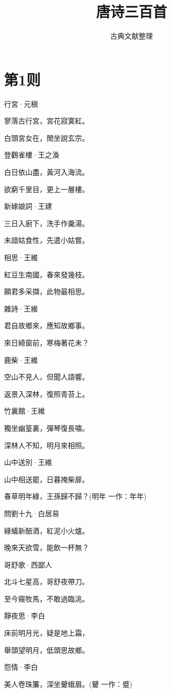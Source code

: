 \documentclass[12pt,a4paper]{ctexbook}
\title{唐诗三百首}
\author{古典文献整理}
\date{}
\begin{document}
\maketitle
\tableofcontents
\newpage
\section{第1则}
行宮·元稹\par
寥落古行宮，宮花寂寞紅。\par
白頭宮女在，閒坐說玄宗。\par
登鸛雀樓·王之渙\par
白日依山盡，黃河入海流。\par
欲窮千里目，更上一層樓。\par
新嫁娘詞·王建\par
三日入廚下，洗手作羹湯。\par
未諳姑食性，先遣小姑嘗。\par
相思·王維\par
紅豆生南國，春來發幾枝。\par
願君多采擷，此物最相思。\par
雜詩·王維\par
君自故鄉來，應知故鄉事。\par
來日綺窗前，寒梅著花未？\par
鹿柴·王維\par
空山不見人，但聞人語響。\par
返景入深林，復照青苔上。\par
竹裏館·王維\par
獨坐幽篁裏，彈琴復長嘯。\par
深林人不知，明月來相照。\par
山中送別·王維\par
山中相送罷，日暮掩柴扉。\par
春草明年綠，王孫歸不歸？(明年 一作：年年)\par
問劉十九·白居易\par
綠蟻新醅酒，紅泥小火爐。\par
晚來天欲雪，能飲一杯無？\par
哥舒歌·西鄙人\par
北斗七星高，哥舒夜帶刀。\par
至今窺牧馬，不敢過臨洮。\par
靜夜思·李白\par
床前明月光，疑是地上霜，\par
舉頭望明月，低頭思故鄉。\par
怨情·李白\par
美人卷珠簾，深坐顰蛾眉。(顰 一作：蹙)\par
\end{document}
